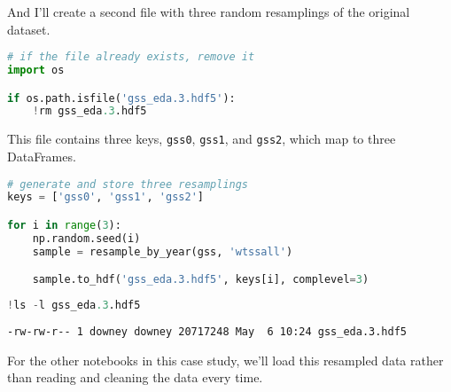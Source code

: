 And I'll create a second file with three random resamplings of the
original dataset.

\begin{lstlisting}[language=Python]
# if the file already exists, remove it
import os

if os.path.isfile('gss_eda.3.hdf5'):
    !rm gss_eda.3.hdf5
\end{lstlisting}

This file contains three keys, \passthrough{\lstinline!gss0!},
\passthrough{\lstinline!gss1!}, and \passthrough{\lstinline!gss2!},
which map to three DataFrames.

\begin{lstlisting}[language=Python]
# generate and store three resamplings
keys = ['gss0', 'gss1', 'gss2']

for i in range(3):
    np.random.seed(i)
    sample = resample_by_year(gss, 'wtssall')

    sample.to_hdf('gss_eda.3.hdf5', keys[i], complevel=3)
\end{lstlisting}

\begin{lstlisting}[language=Python]
!ls -l gss_eda.3.hdf5
\end{lstlisting}

\begin{lstlisting}[]
-rw-rw-r-- 1 downey downey 20717248 May  6 10:24 gss_eda.3.hdf5
\end{lstlisting}

For the other notebooks in this case study, we'll load this resampled
data rather than reading and cleaning the data every time.

